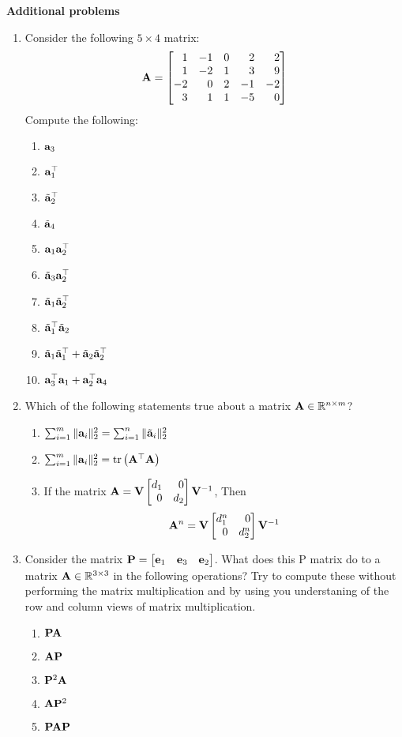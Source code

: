 \documentclass[
10pt, %
a4paper, %
oneside, %
headinclude,footinclude, %
BCOR5mm, %
]{scrartcl}
\def\mf{\ensuremath\mathbf}
\def\mb{\ensuremath\mathbb}
\def\bmx{\ensuremath\begin{bmatrix*}[r]}
\def\emx{\ensuremath\end{bmatrix*}}
\begin{document}
\newpage
\noindent \textbf{Additional problems}
\begin{enumerate}
	\item Consider the following $5 \times 4$ matrix:
	\[ \mf{A} = \bmx  1 & -1 &  0 &  2 &  2 \\
	 1 & -2 &  1 &  3 &  9 \\
	-2 &  0 &  2 & -1 & -2 \\
	 3 &  1 &  1 & -5 &  0
	\emx \]
	Compute the following:
	\begin{enumerate}
		\item $\mf{a}_3$
		\item $\mf{a}_1^\top$
		\item $\tilde{\mf{a}}_2^\top$
		\item $\tilde{\mf{a}}_4$
		\item $\mf{a}_1\mf{a}_2^\top$
		\item $\tilde{\mf{a}}_3\mf{a}_2^\top$
		\item $\tilde{\mf{a}}_1\tilde{\mf{a}}_2^\top$
		\item $\tilde{\mf{a}}_1^\top\tilde{\mf{a}}_2$
		\item $\tilde{\mf{a}}_1\tilde{\mf{a}}_1^\top + \tilde{\mf{a}}_2\tilde{\mf{a}}_2^\top$
		\item $\mf{a}_3^\top\mf{a}_1 + \mf{a}_2^\top\mf{a}_4$
	\end{enumerate}

	\item Which of the following statements true about a matrix $\mf{A} \in \mb{R}^{n \times m}$?
	\begin{enumerate}
		\item $\sum_{i=1}^m \Vert \mf{a}_i \Vert_2^2 = \sum_{i=1}^n \Vert \tilde{\mf{a}}_i \Vert_2^2$
		\item $\sum_{i=1}^m \Vert \mf{a}_i \Vert_2^2 = \text{tr}\pp{\mf{A}^\top\mf{A}}$
		\item If the matrix $\mf{A} = \mf{V} \bmx d_1 &  0 \\ 0 & d_2\emx \mf{V}^{-1}$, Then
		\[ \mf{A}^n = \mf{V} \bmx d_1^n & 0 \\ 0 & d_2^n \emx \mf{V}^{-1} \]
	\end{enumerate}
	\item Consider the matrix $\mf{P} = \bmx \mf{e}_1 & \mf{e}_3 & \mf{e}_2 \emx$. What does this P matrix do to a matrix $\mf{A} \in \mb{R}^{3 \times 3}$ in the following operations? Try to compute these without performing the matrix multiplication and by using you understaning of the row and column views of matrix multiplication.
	\begin{enumerate}
		\item $\mf{P}\mf{A}$
		\item $\mf{A}\mf{P}$
		\item $\mf{P}^2\mf{A}$
		\item $\mf{A}\mf{P}^2$
		\item $\mf{P}\mf{A}\mf{P}$
	\end{enumerate}
\end{enumerate}
\end{document}
